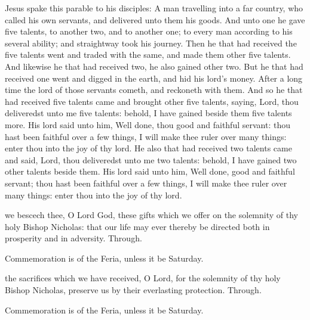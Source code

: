  Jesus spake this parable to his disciples: A man travelling into a far country, who called his own servants, and delivered unto them his goods. And unto one he gave five talents, to another two, and to another one; to every man according to his several ability; and straightway took his journey. Then he that had received the five talents went and traded with the same, and made them other five talents. And likewise he that had received two, he also gained other two. But he that had received one went and digged in the earth, and hid his lord's money. After a long time the lord of those servants cometh, and reckoneth with them. And so he that had received five talents came and brought other five talents, saying, Lord, thou deliveredst unto me five talents: behold, I have gained beside them five talents more. His lord said unto him, Well done, thou good and faithful servant: thou hast been faithful over a few things, I will make thee ruler over many things: enter thou into the joy of thy lord. He also that had received two talents came and said, Lord, thou deliveredst unto me two talents: behold, I have gained two other talents beside them. His lord said unto him, Well done, good and faithful servant; thou hast been faithful over a few things, I will make thee ruler over many things: enter thou into the joy of thy lord.


\secret
{} we bescech thee, O Lord God, these gifts which we offer on the solemnity of thy holy Bishop Nicholas: that our life may ever thereby be directed both in prosperity and in adversity. Through.

\begin{rubric}
	Commemoration is of the Feria, unless it be Saturday.
\end{rubric}


\postcommunion
{} the sacrifices which we have received, O Lord, for the solemnity of thy holy Bishop Nicholas, preserve us by their everlasting protection. Through.

\begin{rubric}
	Commemoration is of the Feria, unless it be Saturday.
\end{rubric}


